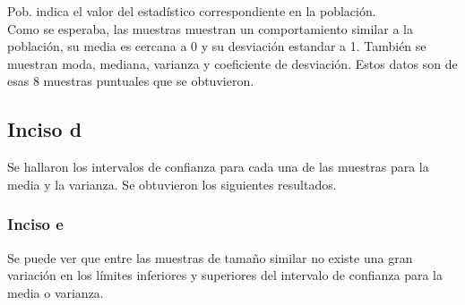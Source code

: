 \documentclass[a4paper,10pt,twocolumn]{article}
\begin{document}
		Pob. indica el valor del estadístico correspondiente en la población.\\
		
		Como se esperaba, las muestras muestran un comportamiento similar a la población, su media es cercana a 0 y su desviación estandar a 1. También se muestran moda, mediana, varianza y coeficiente de desviación. Estos datos son de esas 8 muestras puntuales que se obtuvieron.
		
		\subsection{Inciso d}
		
		Se hallaron los intervalos de confianza para cada una de las muestras para la media y la varianza. Se obtuvieron los siguientes resultados.
		
		\begin{center}
			\centering 
			{
			}
		\end{center}
		
		\subsubsection{Inciso e}
		
		Se puede ver que entre las muestras de tamaño similar no existe una gran variación en los límites inferiores y superiores del intervalo de confianza para la media o varianza.
\end{document}
